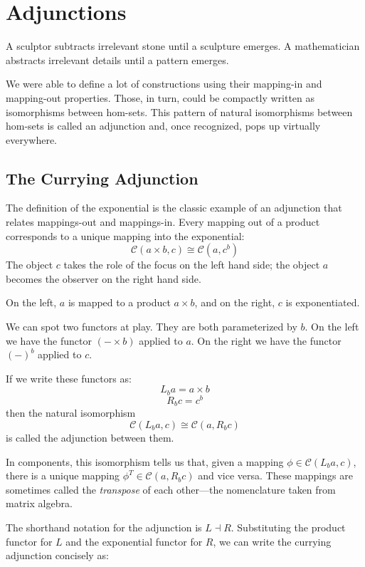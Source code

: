 \documentclass[DaoFP]{subfiles}
\begin{document}
\setcounter{chapter}{9}

\chapter{Adjunctions}

A sculptor subtracts irrelevant stone until a sculpture emerges. A mathematician abstracts irrelevant details until a pattern emerges.

We were able to define a lot of constructions using their mapping-in and mapping-out properties. Those, in turn, could be compactly written as isomorphisms between hom-sets. This pattern of natural isomorphisms between hom-sets is called an adjunction and, once recognized, pops up virtually everywhere.

\section{The Currying Adjunction}

The definition of the exponential is the classic example of an adjunction that relates mappings-out and mappings-in. Every mapping out of a product corresponds to a unique mapping into the exponential:
\[  \mathcal{C}(a \times b, c ) \cong  \mathcal{C} (a, c^b)  \]
The object $c$ takes the role of the focus on the left hand side; the object $a$ becomes the observer on the right hand side. 

On the left, $a$ is mapped to a product $a \times b$, and on the right, $c$ is exponentiated. 

We can spot two functors at play. They are both parameterized by $b$. On the left we have the functor $(- \times b)$ applied to $a$. On the right we have the functor $(-)^b$ applied to $c$. 

If we write these functors as:
\[ L_b a = a \times b \]
\[ R_b c = c^b \]
then the natural isomorphism
\[ \mathcal{C}(L_b a, c) \cong \mathcal{C}(a, R_b c) \]
is called the adjunction between them. 

In components, this isomorphism tells us that, given a mapping $\phi \in \mathcal{C}(L_b a, c)$, there is a unique mapping $\phi^T \in \mathcal{C}(a, R_b c)$ and vice versa. These mappings are sometimes called the \emph{transpose} of each other---the nomenclature taken from matrix algebra.

The shorthand notation for the adjunction is $L \dashv R$. Substituting the product functor for $L$ and the exponential functor for $R$, we can write the currying adjunction concisely as:
\end{document}
